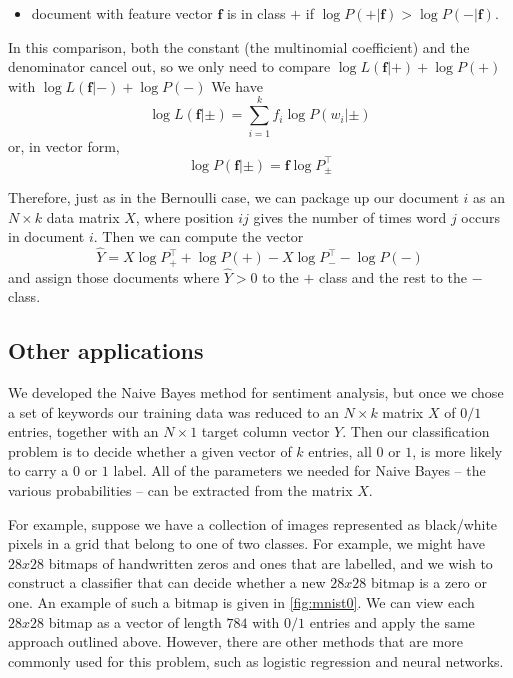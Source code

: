 \documentclass[
]{article}
\providecommand{\tightlist}{%
  \setlength{\itemsep}{0pt}\setlength{\parskip}{0pt}}
\begin{document}
\begin{itemize}
\tightlist
\item
  document with feature vector \(\mathbf{f}\) is in class \(+\) if
  \(\log P(+|\mathbf{f})>\log P(-|\mathbf{f})\).
\end{itemize}

In this comparison, both the constant (the multinomial coefficient) and
the denominator cancel out, so we only need to compare
\(\log L(\mathbf{f}|+)+\log P(+)\) with
\(\log L(\mathbf{f}|-)+\log P(-)\) We have \[
\log L(\mathbf{f}|\pm) = \sum_{i=1}^{k} f_{i}\log P(w_{i}|\pm)
\] or, in vector form, \[
\log P(\mathbf{f}|\pm) = \mathbf{f}\log P_{\pm}^{\intercal}
\]

Therefore, just as in the Bernoulli case, we can package up our document
\(i\) as an \(N\times k\) data matrix \(X\), where position \(ij\) gives
the number of times word \(j\) occurs in document \(i\). Then we can
compute the vector \[
\hat{Y} = X\log P_{+}^{\intercal} + \log P(+)-X\log P_{-}^{\intercal} - \log P(-)
\] and assign those documents where \(\hat{Y}>0\) to the \(+\) class and
the rest to the \(-\) class.

\hypertarget{other-applications}{%
\subsection{Other applications}\label{other-applications}}

We developed the Naive Bayes method for sentiment analysis, but once we
chose a set of keywords our training data was reduced to an
\(N\times k\) matrix \(X\) of \(0/1\) entries, together with an
\(N\times 1\) target column vector \(Y\). Then our classification
problem is to decide whether a given vector of \(k\) entries, all \(0\)
or \(1\), is more likely to carry a \(0\) or \(1\) label. All of the
parameters we needed for Naive Bayes -- the various probabilities -- can
be extracted from the matrix \(X\).

For example, suppose we have a collection of images represented as
black/white pixels in a grid that belong to one of two classes. For
example, we might have \(28x28\) bitmaps of handwritten zeros and ones
that are labelled, and we wish to construct a classifier that can decide
whether a new \(28x28\) bitmap is a zero or one. An example of such a
bitmap is given in \cref{fig:mnist0}. We can view each \(28x28\) bitmap
as a vector of length \(784\) with \(0/1\) entries and apply the same
approach outlined above. However, there are other methods that are more
commonly used for this problem, such as logistic regression and neural
networks.
\end{document}
